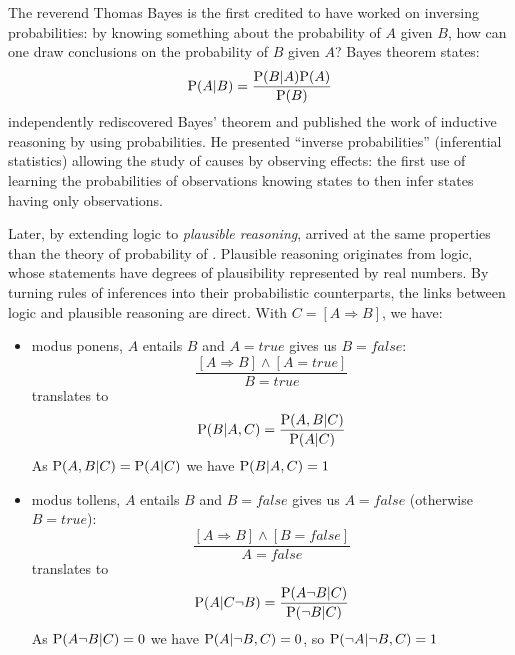 The reverend Thomas Bayes is the first credited to have worked on inversing probabilities: by knowing something about the probability of $A$ given $B$, how can one draw conclusions on the probability of $B$ given $A$? Bayes theorem states: $$\mathrm{P}(A|B) = \frac{\mathrm{P}(B|A)\mathrm{P}(A)}{\mathrm{P}(B)}$$
\cite{Laplace} independently rediscovered Bayes' theorem and published the work of inductive reasoning by using probabilities. He presented ``inverse probabilities'' (inferential statistics) allowing the study of causes by observing effects: the first use of learning the probabilities of observations knowing states to then infer states having only observations.

Later, by extending logic to \textit{plausible reasoning}, \cite{Jaynes} arrived at the same properties than the theory of probability of \cite{Kolmogorov33}. Plausible reasoning originates from logic, whose statements have degrees of plausibility represented by real numbers. %
By turning rules of inferences into their probabilistic counterparts, the links between logic and plausible reasoning are direct. With $C=[A\Rightarrow B]$, we have:
\begin{itemize}
    \item modus ponens, $A$ entails $B$ and $A=true$ gives us $B=false$: $$\frac{[A\Rightarrow B] \wedge [A=true]}{B=true}$$ translates to $$\mathrm{P}(B|A,C)=\frac{\mathrm{P}(A,B|C)}{\mathrm{P}(A|C)}$$
As $\mathrm{P}(A,B|C) = \mathrm{P}(A|C)$ we have $\mathrm{P}(B|A,C)=1$
    \item modus tollens, $A$ entails $B$ and $B=false$ gives us $A=false$ (otherwise $B=true$): $$\frac{[A\Rightarrow B] \wedge [B=false]}{A=false}$$ translates to $$\mathrm{P}(A|C\neg B)=\frac{\mathrm{P}(A \neg B|C)}{\mathrm{P}(\neg B|C)}$$
As $\mathrm{P}(A\neg B | C) = 0$ we have $\mathrm{P}(A|\neg B, C) =0$, so $\mathrm{P}(\neg A| \neg B, C)=1$
    
\end{itemize}
